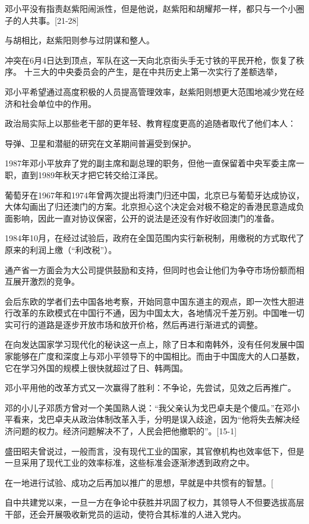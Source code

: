 邓小平没有指责赵紫阳闹派性，但是他说，赵紫阳和胡耀邦一样，都只与一个小圈子的人共事。[21-28]

与胡相比，赵紫阳则参与过阴谋和整人。

冲突在6月4日达到顶点，军队在这一天向北京街头手无寸铁的平民开枪，恢复了秩序。
十三大的中央委员会的产生，是在中共历史上第一次实行了差额选举，

邓小平希望通过高度积极的人员提高管理效率，赵紫阳则想更大范围地减少党在经济和社会单位中的作用。

政治局实际上以那些老干部的更年轻、教育程度更高的追随者取代了他们本人：

导弹、卫星和潜艇的研究在文革期间普遍受到保护。

1987年邓小平放弃了党的副主席和副总理的职务，但他一直保留着中央军委主席一职，直到1989年秋天才把它转交给江泽民。

葡萄牙在1967年和1974年曾两次提出将澳门归还中国，北京已与葡萄牙达成协议，大体勾画出了归还澳门的方案。北京担心这个决定会对极不稳定的香港民意造成负面影响，因此一直对协议保密，公开的说法是还没有作好收回澳门的准备。

1984年10月，在经过试验后，政府在全国范围内实行新税制，用缴税的方式取代了原来的利润上缴（“利改税”）。

通产省一方面会为大公司提供鼓励和支持，但同时也会让他们为争夺市场份额而相互展开激烈的竞争。

会后东欧的学者们去中国各地考察，开始同意中国东道主的观点，即一次性大胆进行改革的东欧模式在中国行不通，因为中国太大，各地情况千差万别。中国唯一切实可行的道路是逐步开放市场和放开价格，然后再进行渐进式的调整。

在向发达国家学习现代化的秘诀这一点上，除了日本和南韩外，没有任何发展中国家能够在广度和深度上与邓小平领导下的中国相比。而由于中国庞大的人口基数，它在学习外国的规模上很快就超过了日、韩两国。

邓小平用他的改革方式又一次赢得了胜利：不争论，先尝试，见效之后再推广。

邓的小儿子邓质方曾对一个美国熟人说：“我父亲认为戈巴卓夫是个傻瓜。”在邓小平看来，戈巴卓夫从政治体制改革入手，分明是误入歧途，因为“他将失去解决经济问题的权力。经济问题解决不了，人民会把他撤职的”。[15-1]

盛田昭夫曾说过，一般而言，没有现代工业的国家，其官僚机构也效率低下，但是一旦采用了现代工业的效率标准，这些标准会逐渐渗透到政府之中。

在一地进行试验、成功之后再加以推广的思想，早就是中共惯有的智慧。[

自中共建党以来，一旦一方在争论中获胜并巩固了权力，其领导人不但要选拔高层干部，还会开展吸收新党员的运动，使符合其标准的人进入党内。

